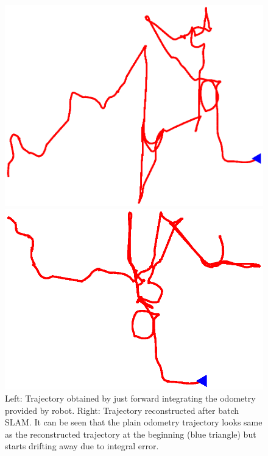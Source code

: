 \begin{figure}
\centering
\begin{minipage}{.5\textwidth}
  \centering
  \includegraphics[width=\textwidth]{Chapters/figures2/dead_reckoning}
\end{minipage}%
\begin{minipage}{.5\textwidth}
  \centering
  \includegraphics[width=\textwidth]{Chapters/figures2/slam_result}
\end{minipage}
\caption{Left: Trajectory obtained by just forward integrating the odometry provided by robot. Right: Trajectory reconstructed after batch SLAM. It can be seen that the plain odometry trajectory looks same as the reconstructed trajectory at the beginning (blue triangle) but starts drifting away due to integral error.}
\label{fig:dr_vs_slam}
\end{figure}
